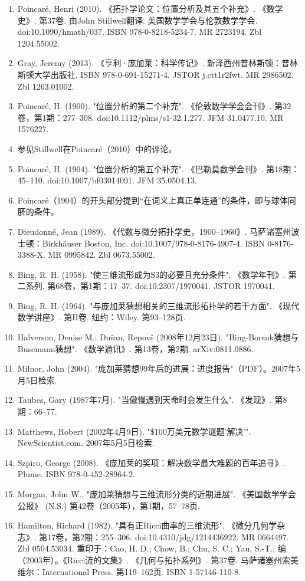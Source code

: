 \begin{enumerate}
\item Poincaré, Henri (2010). 《拓扑学论文：位置分析及其五个补充》. 《数学史》. 第37卷. 由John Stillwell翻译. 美国数学学会与伦敦数学学会. doi:10.1090/hmath/037. ISBN 978-0-8218-5234-7. MR 2723194. Zbl 1204.55002.  
\item Gray, Jeremy (2013). 《亨利·庞加莱：科学传记》. 新泽西州普林斯顿：普林斯顿大学出版社. ISBN 978-0-691-15271-4. JSTOR j.ctt1r2fwt. MR 2986502. Zbl 1263.01002.  
\item Poincaré, H. (1900). "位置分析的第二个补充". 《伦敦数学学会会刊》. 第32卷，第1期：277–308. doi:10.1112/plms/s1-32.1.277. JFM 31.0477.10. MR 1576227.  
\item 参见Stillwell在Poincaré（2010）中的评论。  
\item Poincaré, H. (1904). "位置分析的第五个补充". 《巴勒莫数学会刊》. 第18期：45–110. doi:10.1007/bf03014091. JFM 35.0504.13.  
\item Poincaré（1904）的开头部分提到“在词义上真正单连通”的条件，即与球体同胚的条件。
\item Dieudonné, Jean (1989). 《代数与微分拓扑学史，1900–1960》. 马萨诸塞州波士顿：Birkhäuser Boston, Inc. doi:10.1007/978-0-8176-4907-4. ISBN 0-8176-3388-X. MR 0995842. Zbl 0673.55002.  
\item Bing, R. H. (1958). "使三维流形成为S3的必要且充分条件". 《数学年刊》. 第二系列. 第68卷，第1期：17–37. doi:10.2307/1970041. JSTOR 1970041.
\item Bing, R. H. (1964). "与庞加莱猜想相关的三维流形拓扑学的若干方面". 《现代数学讲座》. 第II卷. 纽约：Wiley. 第93–128页.  
\item Halverson, Denise M.; Dušan, Repovš (2008年12月23日). "Bing-Borsuk猜想与Busemann猜想". 《数学通讯》. 第13卷，第2期. arXiv:0811.0886.  
\item Milnor, John (2004). "庞加莱猜想99年后的进展：进度报告"（PDF）。2007年5月5日检索.  
\item Taubes, Gary (1987年7月). "当傲慢遇到天命时会发生什么". 《发现》. 第8期：66–77.  
\item Matthews, Robert (2002年4月9日). "\$100万美元数学谜题'解决'". NewScientist.com. 2007年5月5日检索.  
\item Szpiro, George (2008). 《庞加莱的奖项：解决数学最大难题的百年追寻》. Plume. ISBN 978-0-452-28964-2.  
\item Morgan, John W., "庞加莱猜想与三维流形分类的近期进展". 《美国数学学会公报》 (N.S.) 第42卷（2005年），第1期，57–78页.  
\item Hamilton, Richard (1982). "具有正Ricci曲率的三维流形". 《微分几何学杂志》. 第17卷，第2期：255–306. doi:10.4310/jdg/1214436922. MR 0664497. Zbl 0504.53034. 重印于：Cao, H. D.; Chow, B.; Chu, S. C.; Yau, S.-T., 编（2003年）。《Ricci流的文集》. 《几何与拓扑系列》. 第37卷. 马萨诸塞州索美维尔：International Press. 第119–162页. ISBN 1-57146-110-8.

\end{enumerate}
